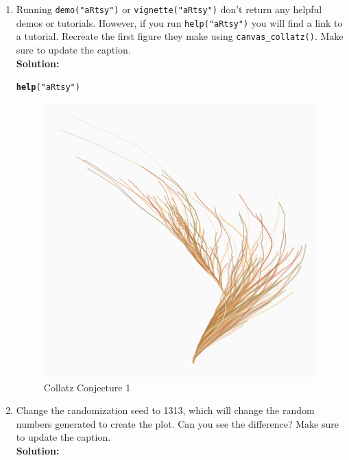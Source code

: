 \documentclass{article}\usepackage[]{graphicx}\usepackage[]{xcolor}
\makeatletter
\def\maxwidth{ %
  \ifdim\Gin@nat@width>\linewidth
    \linewidth
  \else
    \Gin@nat@width
  \fi
}
\newcommand{\hlsng}[1]{\textcolor[rgb]{0.192,0.494,0.8}{#1}}%
\newcommand{\hldef}[1]{\textcolor[rgb]{0.345,0.345,0.345}{#1}}%
\newcommand{\hlkwd}[1]{\textcolor[rgb]{0.737,0.353,0.396}{\textbf{#1}}}%
\newenvironment{kframe}{%
 \def\at@end@of@kframe{}%
 \ifinner\ifhmode%
  \def\at@end@of@kframe{\end{minipage}}%
  \begin{minipage}{\columnwidth}%
 \fi\fi%
 \def\FrameCommand##1{\hskip\@totalleftmargin \hskip-\fboxsep
 \colorbox{shadecolor}{##1}\hskip-\fboxsep
     \hskip-\linewidth \hskip-\@totalleftmargin \hskip\columnwidth}%
 \MakeFramed {\advance\hsize-\width
   \@totalleftmargin\z@ \linewidth\hsize
   \@setminipage}}%
 {\par\unskip\endMakeFramed%
 \at@end@of@kframe}
\newenvironment{knitrout}{}{} %
\makeatother
\begin{document}
\begin{enumerate}
\begin{enumerate}
 \item Running \texttt{demo("aRtsy")} or \texttt{vignette("aRtsy")} don't return 
 any helpful demos or tutorials. However, if you run \texttt{help("aRtsy")} you 
 will find a link to a tutorial. Recreate the first figure they make using 
 \texttt{canvas\_collatz()}. Make sure to update the caption.\\
\textbf{Solution:}
\begin{knitrout}\scriptsize
{}\color{fgcolor}\begin{kframe}
\begin{alltt}
\hlkwd{help}\hldef{(}\hlsng{"aRtsy"}\hldef{)}
\end{alltt}
\end{kframe}
\end{knitrout}
\begin{figure}[H]
\begin{center}
\begin{knitrout}
\color{fgcolor}
\includegraphics[width=\maxwidth]{figure/unnamed-chunk-3-1} 
\end{knitrout}
\caption{Collatz Conjecture 1}
\label{CollatzPlot1}
\end{center}
\end{figure}
  \item Change the randomization seed to 1313, which will change the random
  numbers generated to create the plot. Can you see the difference? Make sure to 
  update the caption.\\
\textbf{Solution:}


\end{enumerate}
\end{enumerate}
\end{document}
